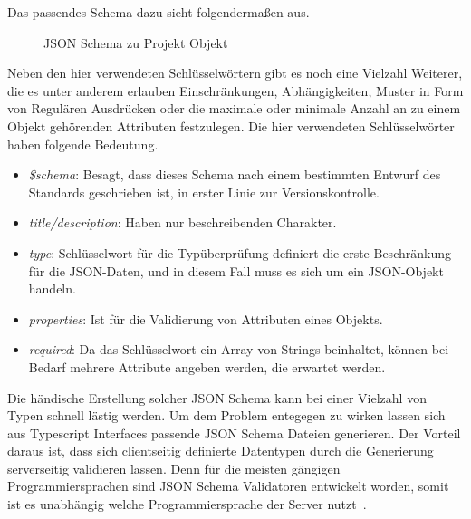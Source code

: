 Das passendes Schema dazu sieht folgendermaßen aus.

\begin{figure}[h]
    
    \caption{JSON Schema zu Projekt Objekt}
    \label{fig:basics:jsonschema:2}
\end{figure}

Neben den hier verwendeten Schlüsselwörtern gibt es noch eine Vielzahl Weiterer, die es unter anderem erlauben Einschränkungen, Abhängigkeiten,
Muster in Form von Regulären Ausdrücken oder die maximale oder minimale Anzahl an zu einem Objekt gehörenden Attributen festzulegen.
Die hier verwendeten Schlüsselwörter haben folgende Bedeutung.

\begin{itemize}
    \item \emph{\$schema}: Besagt, dass dieses Schema nach einem bestimmten Entwurf des Standards geschrieben ist, in erster Linie zur Versionskontrolle.
    \item \emph{title/description}: Haben nur beschreibenden Charakter.
    \item \emph{type}: Schlüsselwort für die Typüberprüfung definiert die erste Beschränkung für die JSON-Daten, und in diesem Fall muss es sich um ein JSON-Objekt handeln.
    \item \emph{properties}: Ist für die Validierung von Attributen eines Objekts.
    \item \emph{required}: Da das Schlüsselwort ein Array von Strings beinhaltet, können bei Bedarf mehrere Attribute angeben werden, die erwartet werden.
\end{itemize}

Die händische Erstellung solcher JSON Schema kann bei einer Vielzahl von Typen schnell lästig werden.
Um dem Problem entegegen zu wirken lassen sich aus Typescript Interfaces passende JSON Schema Dateien generieren.
Der Vorteil daraus ist, dass sich clientseitig definierte Datentypen durch die Generierung serverseitig validieren lassen.
Denn für die meisten gängigen Programmiersprachen sind JSON Schema Validatoren entwickelt worden, somit ist es unabhängig welche Programmiersprache der Server nutzt~\cite{json-schema-implementations}.


